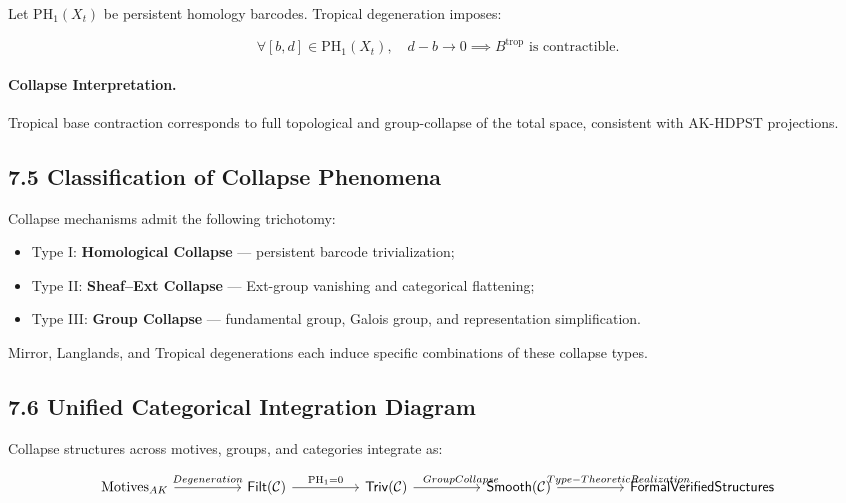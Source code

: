 \documentclass[11pt]{article}
\begin{document}
Let \( \mathrm{PH}_1(X_t) \) be persistent homology barcodes. Tropical degeneration imposes:

\[
\forall [b,d] \in \mathrm{PH}_1(X_t), \quad d - b \to 0 \implies B^{\mathrm{trop}} \text{ is contractible}.
\]

\paragraph{Collapse Interpretation.}
Tropical base contraction corresponds to full topological and group-collapse of the total space, consistent with AK-HDPST projections.

\subsection*{7.5 Classification of Collapse Phenomena}

Collapse mechanisms admit the following trichotomy:

\begin{itemize}
    \item Type I: \textbf{Homological Collapse} — persistent barcode trivialization;
    \item Type II: \textbf{Sheaf–Ext Collapse} — Ext-group vanishing and categorical flattening;
    \item Type III: \textbf{Group Collapse} — fundamental group, Galois group, and representation simplification.
\end{itemize}

Mirror, Langlands, and Tropical degenerations each induce specific combinations of these collapse types.

\subsection*{7.6 Unified Categorical Integration Diagram}

Collapse structures across motives, groups, and categories integrate as:

\[
\begin{tikzcd}[column sep=huge]
\mathrm{Motives}_{AK} \arrow[r, "Degeneration"]
& \mathsf{Filt}(\mathcal{C}) \arrow[r, "\mathrm{PH}_1 = 0"]
& \mathsf{Triv}(\mathcal{C}) \arrow[r, "\hspace{2em}Group Collapse"]
& \mathsf{Smooth}(\mathcal{C}) \arrow[r, "\hspace{4em}Type-Theoretic Realization"]
& \mathsf{Formal Verified Structures}
\end{tikzcd}
\]
\end{document}
